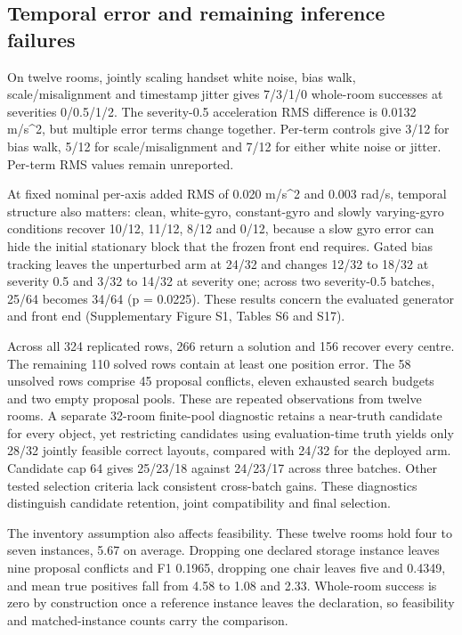 \documentclass[10pt,twocolumn,letterpaper]{article}
\begin{document}
\subsection{Temporal error and remaining inference
failures}\label{temporal-error-and-remaining-inference-failures}

On twelve rooms, jointly scaling handset white noise, bias walk,
scale/misalignment and timestamp jitter gives 7/3/1/0 whole-room
successes at severities 0/0.5/1/2. The severity-0.5 acceleration RMS
difference is 0.0132 m/s\^{}2, but multiple error terms change together.
Per-term controls give 3/12 for bias walk, 5/12 for scale/misalignment
and 7/12 for either white noise or jitter. Per-term RMS values remain
unreported.

At fixed nominal per-axis added RMS of 0.020 m/s\^{}2 and 0.003 rad/s,
temporal structure also matters: clean, white-gyro, constant-gyro and
slowly varying-gyro conditions recover 10/12, 11/12, 8/12 and 0/12,
because a slow gyro error can hide the initial stationary block that the
frozen front end requires. Gated bias tracking leaves the unperturbed
arm at 24/32 and changes 12/32 to 18/32 at severity 0.5 and 3/32 to
14/32 at severity one; across two severity-0.5 batches, 25/64 becomes
34/64 (p = 0.0225). These results concern the evaluated generator and
front end (Supplementary Figure S1, Tables S6 and S17).

Across all 324 replicated rows, 266 return a solution and 156 recover
every centre. The remaining 110 solved rows contain at least one
position error. The 58 unsolved rows comprise 45 proposal conflicts,
eleven exhausted search budgets and two empty proposal pools. These are
repeated observations from twelve rooms. A separate 32-room finite-pool
diagnostic retains a near-truth candidate for every object, yet
restricting candidates using evaluation-time truth yields only 28/32
jointly feasible correct layouts, compared with 24/32 for the deployed
arm. Candidate cap 64 gives 25/23/18 against 24/23/17 across three
batches. Other tested selection criteria lack consistent cross-batch
gains. These diagnostics distinguish candidate retention, joint
compatibility and final selection.

The inventory assumption also affects feasibility. These twelve rooms
hold four to seven instances, 5.67 on average. Dropping one declared
storage instance leaves nine proposal conflicts and F1 0.1965, dropping
one chair leaves five and 0.4349, and mean true positives fall from 4.58
to 1.08 and 2.33. Whole-room success is zero by construction once a
reference instance leaves the declaration, so feasibility and
matched-instance counts carry the comparison.
\end{document}
